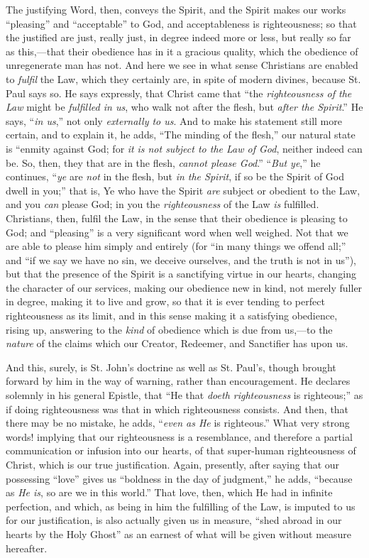 The justifying Word, then, conveys the Spirit, and the Spirit makes
our works ``pleasing'' and ``acceptable'' to God, and
acceptableness is righteousness; so that the justified are just,
really just, in degree indeed more or less, but really so far as this,—that
their obedience has in it a gracious quality, which the obedience of
unregenerate man has not. And here we see in what sense Christians are
enabled to \emph{fulfil} the Law, which they certainly are, in spite
of modern divines, because St. Paul says so. He says expressly, that
Christ came that ``the \emph{righteousness of the Law} might be \emph{fulfilled
in us}, who walk not after the flesh, but \emph{after the Spirit}.''
He says, ``\emph{in us},'' not only \emph{externally to us}.
And to make his statement still more certain, and to explain it, he
adds, ``The minding of the flesh,'' our natural state is
``enmity against God; for \emph{it} \emph{is not subject to the
Law of God}, neither indeed can be. So, then, they that are in the
flesh, \emph{cannot please God}.'' ``\emph{But ye},'' he
continues, ``\emph{ye} are \emph{not} in the flesh, but \emph{in the
Spirit}, if so be the Spirit of God dwell in you;'' that is, Ye
who have the Spirit \emph{are} subject or obedient to the Law, and you
\emph{can} please God; in you the \emph{righteousness} of the Law \emph{is}
fulfilled. Christians, then, fulfil the Law, in the sense that their
obedience is pleasing to God; and ``pleasing'' is a very
significant word when well weighed. Not that we are able to please him
simply and entirely (for ``in many things we offend all;'' and
``if we say we have no sin, we deceive ourselves, and the truth is
not in us''), but that the presence of the Spirit is a sanctifying
virtue in our hearts, changing the character of our services, making
our obedience new in kind, not merely fuller in degree, making it to
live and grow, so that it is ever tending to perfect righteousness as
its limit, and in this sense making it a satisfying obedience, rising
up, answering to the \emph{kind} of obedience which is due from us,—to
the \emph{nature} of the claims which our Creator, Redeemer, and
Sanctifier has upon us.

And this, surely, is St. John's doctrine as well as St. Paul's,
though brought forward by him in the way of warning, rather than
encouragement. He declares solemnly in his general Epistle, that
``He that \emph{doeth righteousness} is righteous;'' as if
doing righteousness was that in which righteousness consists. And
then, that there may be no mistake, he adds, ``\emph{even as He}
is righteous.'' What very strong words! implying that our
righteousness is a resemblance, and therefore a partial communication
or infusion into our hearts, of that super-human righteousness of
Christ, which is our true justification. Again, presently, after
saying that our possessing ``love'' gives us ``boldness in
the day of judgment,'' he adds, ``because as \emph{He is}, so
are we in this world.'' That love, then, which He had in infinite
perfection, and which, as being in him the fulfilling of the Law, is
imputed to us for our justification, is also actually given us in
measure, ``shed abroad in our hearts by the Holy Ghost'' as an
earnest of what will be given without measure hereafter.


